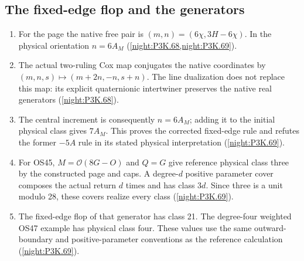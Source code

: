 \subsection{The fixed-edge flop and the generators}
\RungOne
\begin{enumerate}[label=\arabic*.]
\item For the page the native free pair is
  $(m,n)=(6\chi,3H-6\chi)$.  In the physical orientation
  $n=6A_M$ (\cref{night:P3K.68,night:P3K.69}).
\item The actual two-ruling Cox map conjugates the native
  coordinates by $(m,n,s)\mapsto(m+2n,-n,s+n)$.
  The line dualization does not replace this map: its explicit
  quaternionic intertwiner preserves the native real generators
  (\cref{night:P3K.68}).
\item The central increment is consequently $n=6A_M$; adding it
  to the initial physical class gives $7A_M$.  This proves the
  corrected fixed-edge rule and refutes the former $-5A$ rule
  in its stated physical interpretation
  (\cref{night:P3K.69}).
\item For OS45, $M=\mathcal O(8G-O)$ and $Q=G$ give reference
  physical class three by the constructed page and caps.  A
  degree-$d$ positive parameter cover composes the actual return
  $d$ times and has class $3d$.  Since three is a unit modulo 28,
  these covers realize every class
  (\cref{night:P3K.69}).
\item The fixed-edge flop of that generator has class 21.  The
  degree-four weighted OS47 example has physical class four.
  These values use the same outward-boundary and positive-parameter
  conventions as the reference calculation
  (\cref{night:P3K.69}).
\end{enumerate}

